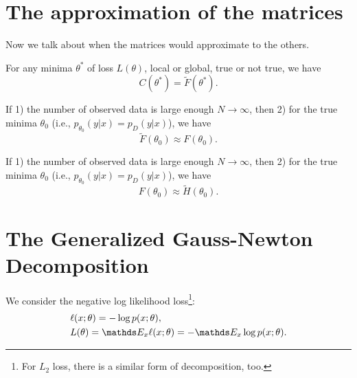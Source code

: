 \documentclass{article}
\begin{document}
\section{The approximation of the matrices}
Now we talk about when the matrices would approximate to the others.

\begin{prop}
For any minima $\theta^*$ of loss $L(\theta)$, local or global, true or not true, we have
\begin{equation*}
    C(\theta^*) = \tilde{F}(\theta^*).
\end{equation*}
\end{prop}

\begin{prop}
If 1) the number of observed data is large enough $N\to \infty$,
then 2) for the true minima $\theta_0$ (i.e., $p_{\theta_0}(y|x) = p_D(y|x)$), we have
\begin{equation*}
    \tilde{F}(\theta_0) \approx F(\theta_0).
\end{equation*}
\end{prop}


\begin{prop}[$F \approx H$]
If 1) the number of observed data is large enough $N\to \infty$,
then 2) for the true minima $\theta_0$ (i.e., $p_{\theta_0}(y|x) = p_D(y|x)$), we have
\begin{equation*}
    F(\theta_0) \approx \tilde H(\theta_0).
\end{equation*}

\end{prop}


\section{The Generalized Gauss-Newton Decomposition}
We consider the negative log likelihood loss\footnote{For $L_2$ loss, there is a similar form of decomposition, too.}:
\begin{equation*}
\begin{aligned}
    &\ell(x;\theta) = - \log p(x;\theta),\\
    &L(\theta) = \Ebb_{x} \ell(x;\theta) = - \Ebb_{x}\log p(x;\theta).
\end{aligned}
\end{equation*}
\end{document}
